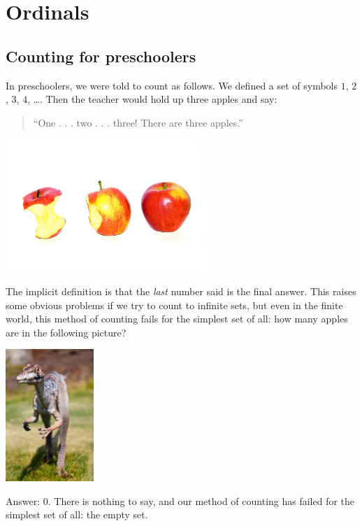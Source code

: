\chapter{Ordinals}
\section{Counting for preschoolers}
In preschoolers, we were told to count as follows.
We defined a set of symbols $1$, $2$, $3$, $4$, \dots.
Then the teacher would hold up three apples and say:
\begin{quote}
	``One . . . two . . . three!  There are three apples.''
\end{quote}

\begin{center}
	\includegraphics[height=5cm]{media/three-apples.jpg}
\end{center}


The implicit definition is that the \emph{last} number said is the final answer.
This raises some obvious problems if we try to count to infinite sets, but even in the finite
world, this method of counting fails for the simplest set of all:
how many apples are in the following picture?

\begin{center}
	\includegraphics[height=5cm]{media/velociraptor.jpg}
\end{center}


Answer: $0$. There is nothing to say, and our method of counting has failed
for the simplest set of all: the empty set.

